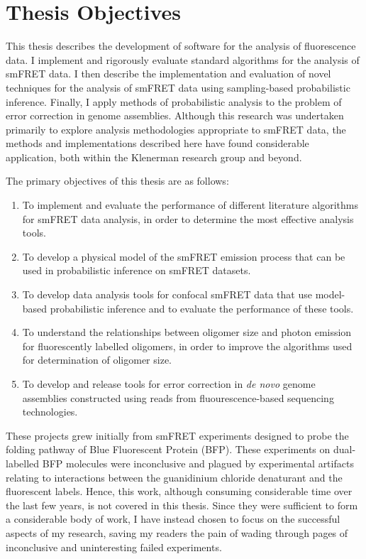 \section{Thesis Objectives}
This thesis describes the development of software for the analysis of fluorescence data. I implement and rigorously evaluate standard algorithms for the analysis of smFRET data. I then describe the implementation and evaluation of novel techniques for the analysis of smFRET data using sampling-based probabilistic inference. Finally, I apply methods of probabilistic analysis to the problem of error correction in genome assemblies. Although this research was undertaken primarily to explore analysis methodologies appropriate to smFRET data, the methods and implementations described here have found considerable application, both within the Klenerman research group and beyond.

The primary objectives of this thesis are as follows:

\begin{enumerate}

\item To implement and evaluate the performance of different literature algorithms for smFRET data analysis, in order to determine the most effective analysis tools.

\item To develop a physical model of the smFRET emission process that can be used in probabilistic inference on smFRET datasets.

\item To develop data analysis tools for confocal smFRET data that use model-based probabilistic inference and to evaluate the performance of these tools.

\item To understand the relationships between oligomer size and photon emission for fluorescently labelled oligomers, in order to improve the algorithms used for determination of oligomer size.

\item To develop and release tools for error correction in \emph{de novo} genome assemblies constructed using reads from fluourescence-based sequencing technologies.    

\end{enumerate}

These projects grew initially from smFRET experiments designed to probe the folding pathway of Blue Fluorescent Protein (BFP). These experiments on dual-labelled BFP molecules were inconclusive and plagued by experimental artifacts relating to interactions between the guanidinium chloride denaturant and the fluorescent labels. Hence, this work, although consuming considerable time over the last few years, is not covered in this thesis. Since they were sufficient to form a considerable body of work, I have instead chosen to focus on the successful aspects of my research, saving my readers the pain of wading through pages of inconclusive and uninteresting failed experiments.

